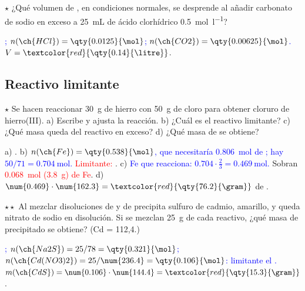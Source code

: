\begin{exercise}
    \(\star\) ¿Qué volumen de , en condiciones normales, se desprende al añadir carbonato de sodio en exceso a \qty{25}{\mL}
    de ácido clorhídrico \qty{0.5}{\mol\per\litre}?
    \begin{solu}
        \textcolor{blue}{; \(n(\ch{HCl}) = \qty{0.0125}{\mol}\); \(n(\ch{CO2}) = \qty{0.00625}{\mol}\).}
        \(V = \textcolor{red}{\qty{0.14}{\litre}}\).
    \end{solu}
\end{exercise}

\subsection{Reactivo limitante}

\begin{exercise}
    \(\star\) Se hacen reaccionar \qty{30}{\gram} de hierro con \qty{50}{\gram} de cloro para obtener cloruro de hierro(III).
    a) Escribe y ajusta la reacción. b) ¿Cuál es el reactivo limitante? c) ¿Qué masa queda del reactivo en exceso? d) ¿Qué masa de
     se obtiene?
    \begin{solu}
        a) \textcolor{red}{}. b) \textcolor{blue}{\(n(\ch{Fe}) = \qty{0.538}{\mol}\), que necesitaría
        \qty{0.806}{\mol} de ; hay \(50/71 = \qty{0.704}{\mol}\).} \textcolor{red}{Limitante: }. c)
        \textcolor{blue}{Fe que reacciona: \(\num{0.704} \cdot \frac{2}{3} = \qty{0.469}{\mol}\).} Sobran \textcolor{red}{\qty{0.068}{\mol}
        (\qty{3.8}{\gram}) de Fe}. d) \(\num{0.469} \cdot \num{162.3} = \textcolor{red}{\qty{76.2}{\gram}}\) de .
    \end{solu}
\end{exercise}

\begin{exercise}
    \(\star\star\) Al mezclar disoluciones de  y de  precipita sulfuro de cadmio, amarillo, y queda nitrato de
    sodio en disolución. Si se mezclan \qty{25}{\gram} de cada reactivo, ¿qué masa de precipitado se obtiene? (Cd = 112,4.)
    \begin{solu}
        \textcolor{blue}{; \(n(\ch{Na2S}) = 25/78 = \qty{0.321}{\mol}\); \(n(\ch{Cd(NO3)2}) =
        25/\num{236.4} = \qty{0.106}{\mol}\): limitante el .} \(m(\ch{CdS}) = \num{0.106} \cdot \num{144.4} =
        \textcolor{red}{\qty{15.3}{\gram}}\).
    \end{solu}
\end{exercise}

